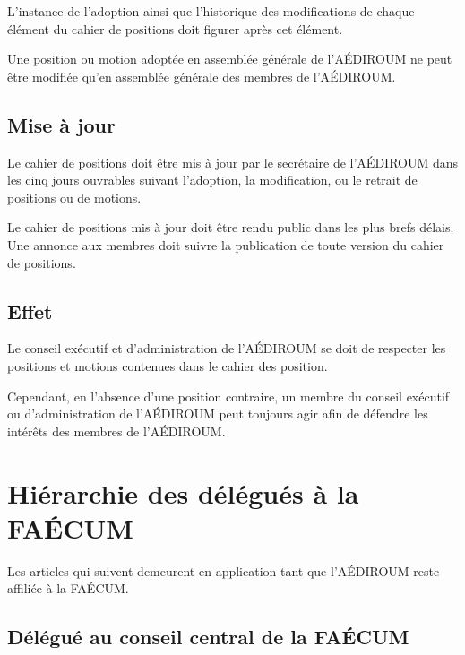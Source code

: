 \documentclass[12pt]{article}
\begin{document}
L’instance de l’adoption ainsi que l’historique des modifications de chaque élément du cahier de positions doit figurer après cet élément.

Une position ou motion adoptée en assemblée générale de l’AÉDIROUM ne peut être modifiée qu’en assemblée générale des membres de l’AÉDIROUM.

\subsection{Mise à jour}

Le cahier de positions doit être mis à jour par le secrétaire de l’AÉDIROUM dans les cinq jours ouvrables suivant l’adoption, la modification, ou le retrait de positions ou de motions.

Le cahier de positions mis à jour doit être rendu public dans les plus brefs délais. Une annonce aux membres doit suivre la publication de toute version du cahier de positions.

\subsection{Effet}

Le conseil exécutif et d’administration de l’AÉDIROUM se doit de respecter les positions et motions contenues dans le cahier des position.

Cependant, en l’absence d’une position contraire, un membre du conseil exécutif ou d’administration de l’AÉDIROUM peut toujours agir afin de défendre les intérêts des membres de l’AÉDIROUM.

\section{Hiérarchie des délégués à la FAÉCUM}

Les articles qui suivent demeurent en application tant que l'AÉDIROUM reste affiliée à la FAÉCUM.

\subsection{Délégué au conseil central de la FAÉCUM}
\end{document}
